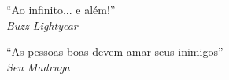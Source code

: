 \begin{titlepage}
 \vspace*{5cm}
 \begin{flushright}
  ``Ao infinito... e além!''\\\textit{Buzz Lightyear}
  \vspace{1cm}
 \end{flushright}

 \begin{flushright}
  ``As pessoas boas devem amar seus inimigos''\\\textit{Seu Madruga}
  \vspace{1cm}
 \end{flushright}
\end{titlepage}
